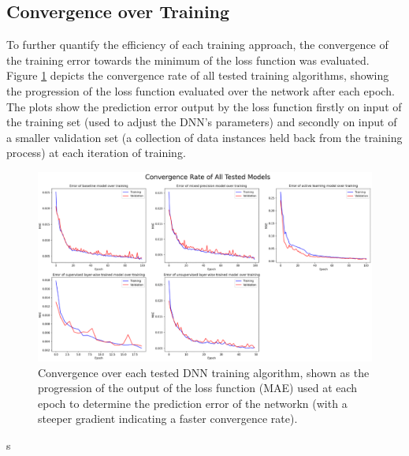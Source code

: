 \documentclass[a4paper, 11pt]{report}
\begin{document}
    \subsection{Convergence over Training}

    To further quantify the efficiency of each training approach, the convergence of the training error towards the minimum of the loss function was evaluated. Figure \ref{fig: convergence} depicts the convergence rate of all tested training algorithms, showing the progression of the loss function evaluated over the network after each epoch. The plots show the prediction error output by the loss function firstly on input of the training set (used to adjust the DNN's parameters) and secondly on input of a smaller validation set (a collection of data instances held back from the training process) at each iteration of training.


    \begin{figure}[ht!]
        \centering
        \includegraphics[width=\textwidth]{results/all-training-loss.png}
        \caption{\centering Convergence over each tested DNN training algorithm, shown as the progression of the output of the loss function (MAE) used at each epoch to determine the prediction error of the networkn (with a steeper gradient indicating a faster convergence rate).}
        \label{fig: convergence}
    \end{figure}
s
\end{document}
